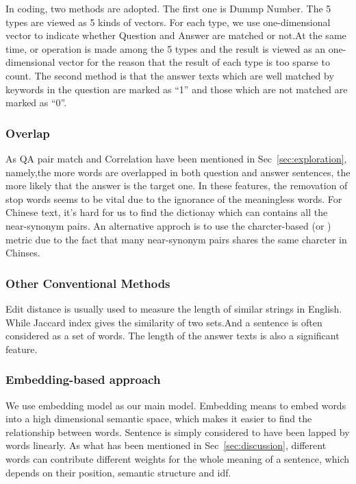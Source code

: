 \documentclass{llncs}
\begin{document}
In coding, two methods are adopted. The first one is Dummp Number. The 5 types are viewed as 5 kinds of vectors. For each type, we use one-dimensional vector to indicate whether Question and Answer are matched or not.At the same time, or operation is made among the 5 types and the result is viewed as an one-dimensional vector for the reason that the result of each type is too sparse to count. The second method is that the answer texts which are well matched by keywords in the question are marked as “1” and those which are not matched are marked as “0”.


\subsubsection{Overlap}
As QA pair match and Correlation have been mentioned in Sec~\ref{sec:exploration}, namely,the more words are overlapped in both question and answer sentences, the more likely that the answer is the target one.
In these features, the removation of stop words seems to be vital due to the ignorance of the meaningless words. For Chinese text, it's hard for us to find the dictionay which can contains all the near-synonym pairs. An alternative approch is to use the charcter-based (or ) metric due to the fact that many near-synonym pairs shares the same charcter in Chinses.


\subsubsection{Other Conventional Methods}
Edit distance is usually used to measure the length of similar strings in English. While Jaccard index gives the similarity of two sets.And a sentence is often considered as a set of words.
The length of the answer texts is also a significant feature.


\subsubsection{Embedding-based approach}
\label{sec:embedding}
We use embedding model as our main model. Embedding means to embed words into a high dimensional semantic space, which makes it easier to find the relationship between words. Sentence is simply considered to have been lapped by words linearly. As what has been mentioned in Sec~\ref{sec:discussion}, different words can contribute different weights for the whole meaning of a sentence, which depends on their position, semantic structure and idf.
\end{document}
